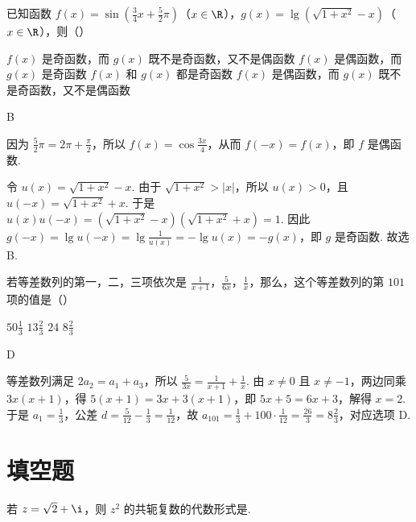\documentclass[UTF8,a4paper,oneside,11pt]{ctexbook}
\begin{document}
\begin{problem}
已知函数 \(f(x)=\sin\left(\frac34x+\frac52\pi\right)\)（\(x\in\R\)），\(g(x)=\lg\left(\sqrt{1+x^{2}}-x\right)\)（\(x\in\R\)），则（\quad）

\choices
{\(f(x)\) 是奇函数，而 \(g(x)\) 既不是奇函数，又不是偶函数}
{\(f(x)\) 是偶函数，而 \(g(x)\) 是奇函数}
{\(f(x)\) 和 \(g(x)\) 都是奇函数}
{\(f(x)\) 是偶函数，而 \(g(x)\) 既不是奇函数，又不是偶函数}
\end{problem}

\begin{answer}B\end{answer}

\begin{solution}
因为 \(\frac52\pi=2\pi+\frac\pi2\)，所以 \(f(x)=\cos\frac{3x}{4}\)，从而 \(f(-x)=f(x)\)，即 \(f\) 是偶函数.

令 \(u(x)=\sqrt{1+x^{2}}-x\). 由于 \(\sqrt{1+x^{2}}>|x|\)，所以 \(u(x)>0\)，且 \(u(-x)=\sqrt{1+x^{2}}+x\). 于是 \(u(x)u(-x)=\left(\sqrt{1+x^{2}}-x\right)\left(\sqrt{1+x^{2}}+x\right)=1\). 因此 \(g(-x)=\lg u(-x)=\lg\frac1{u(x)}=-\lg u(x)=-g(x)\)，即 \(g\) 是奇函数. 故选 B.
\end{solution}

\begin{problem}
若等差数列的第一，二，三项依次是 \(\frac1{x+1}\)，\(\frac5{6x}\)，\(\frac1{x}\)，那么，这个等差数列的第 \(101\) 项的值是（\quad）

\choices
{\(50\frac13\)}
{\(13\frac23\)}
{\(24\)}
{\(8\frac23\)}
\end{problem}

\begin{answer}D\end{answer}

\begin{solution}
等差数列满足 \(2a_{2}=a_{1}+a_{3}\)，所以 \(\frac{5}{3x}=\frac1{x+1}+\frac1{x}\). 由 \(x\neq0\) 且 \(x\neq-1\)，两边同乘 \(3x(x+1)\)，得 \(5(x+1)=3x+3(x+1)\)，即 \(5x+5=6x+3\)，解得 \(x=2\). 于是 \(a_{1}=\frac13\)，公差 \(d=\frac{5}{12}-\frac13=\frac1{12}\)，故 \(a_{101}=\frac13+100\cdot\frac1{12}=\frac{26}{3}=8\frac23\)，对应选项 D.
\end{solution}

\section{填空题}

\begin{problem}
若 \(z=\sqrt2+\i\)，则 \(z^{2}\) 的共轭复数的代数形式是\fillinblank{}.
\end{problem}
\end{document}
